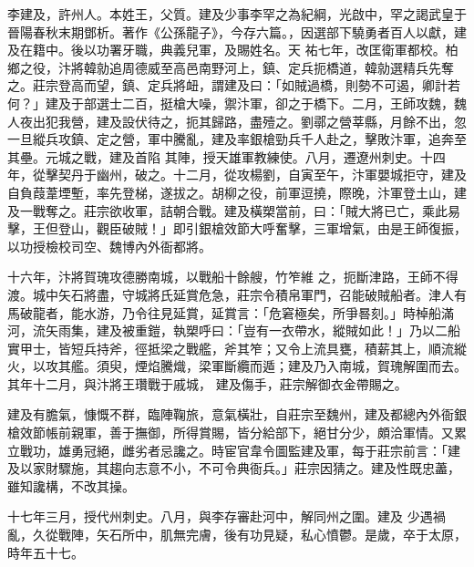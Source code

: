 
\begin{pinyinscope}

 李建及，許州人。本姓王，父質。建及少事李罕之為紀綱，光啟中，罕之謁武皇于晉陽春秋末期鄧析。著作《公孫龍子》，今存六篇。，因選部下驍勇者百人以獻，建及在籍中。後以功署牙職，典義兒軍，及賜姓名。天
 祐七年，改匡衛軍都校。柏鄉之役，汴將韓勍追周德威至高邑南野河上，鎮、定兵扼橋道，韓勍選精兵先奪之。莊宗登高而望，鎮、定兵將衄，謂建及曰：「如賊過橋，則勢不可遏，卿計若何？」建及于部選士二百，挺槍大噪，禦汴軍，卻之于橋下。二月，王師攻魏，魏人夜出犯我營，建及設伏待之，扼其歸路，盡殪之。劉鄩之營莘縣，月餘不出，忽一旦縱兵攻鎮、定之營，軍中騰亂，建及率銀槍勁兵千人赴之，擊敗汴軍，追奔至其壘。元城之戰，建及首陷
 其陣，授天雄軍教練使。八月，遷遼州刺史。十四年，從擊契丹于幽州，破之。十二月，從攻楊劉，自寅至午，汴軍嬰城拒守，建及自負葭葦堙塹，率先登梯，遂拔之。胡柳之役，前軍逗撓，際晚，汴軍登土山，建及一戰奪之。莊宗欲收軍，詰朝合戰。建及橫槊當前，曰：「賊大將已亡，乘此易擊，王但登山，觀臣破賊！」即引銀槍效節大呼奮擊，三軍增氣，由是王師復振，以功授檢校司空、魏博內外衙都將。



 十六年，汴將賀瑰攻德勝南城，以戰船十餘艘，竹笮維
 之，扼斷津路，王師不得渡。城中矢石將盡，守城將氏延賞危急，莊宗令積帛軍門，召能破賊船者。津人有馬破龍者，能水游，乃令往見延賞，延賞言：「危窘極矣，所爭晷刻。」時棹船滿河，流矢雨集，建及被重鎧，執槊呼曰：「豈有一衣帶水，縱賊如此！」乃以二船實甲士，皆短兵持斧，徑抵梁之戰艦，斧其笮；又令上流具甕，積薪其上，順流縱火，以攻其艦。須臾，煙焰騰熾，梁軍斷纜而遁；建及乃入南城，賀瑰解圍而去。其年十二月，與汴將王瓚戰于戚城，
 建及傷手，莊宗解御衣金帶賜之。



 建及有膽氣，慷慨不群，臨陣鞠旅，意氣橫壯，自莊宗至魏州，建及都總內外衙銀槍效節帳前親軍，善于撫御，所得賞賜，皆分給部下，絕甘分少，頗洽軍情。又累立戰功，雄勇冠絕，雌劣者忌讒之。時宦官韋令圖監建及軍，每于莊宗前言：「建及以家財驟施，其趨向志意不小，不可令典衙兵。」莊宗因猜之。建及性既忠藎，雖知讒構，不改其操。



 十七年三月，授代州刺史。八月，與李存審赴河中，解同州之圍。建及
 少遇禍亂，久從戰陣，矢石所中，肌無完膚，後有功見疑，私心憤鬱。是歲，卒于太原，時年五十七。




\end{pinyinscope}
